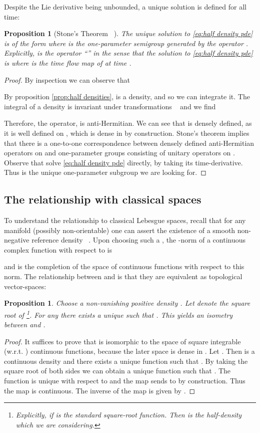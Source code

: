 \documentclass[final,leqno]{amsart}
\newtheorem{proposition}[theorem]{Proposition}
\begin{document}
Despite the Lie derivative being unbounded, a unique solution is defined for all time:
\begin{proposition}[Stone's Theorem ~\cite{Conway1990,Rudin1991}] \label{prop:stone}
	The unique solution to \eqref{eq:half density pde} is of the form  where  is the one-parameter semigroup generated by the operator .
	Explicitly,  is the operator ``'' in the sense that the solution to \eqref{eq:half density pde} is  where  is the time flow map of  at time .
\end{proposition}
\begin{proof}
	By inspection we can observe that
	
	By proposition \ref{prop:half densities},  is a density, and so we can integrate it.
	The integral of a density is invariant under  transformations ~\cite[Proposition 16.42]{Lee2006} and we find
	
	Therefore, the operator,  is anti-Hermitian.
	We can see that  is densely defined, as it is well defined on , which is dense in  by construction.
	Stone's theorem implies that there is a one-to-one correspondence between densely defined anti-Hermitian operators on 
	and one-parameter groups  consisting of unitary operators on .
	Observe that  solve \eqref{eq:half density pde} directly, by taking its time-derivative.
	Thus  is the unique one-parameter subgroup we are looking for.
\end{proof}

\subsection{The relationship with classical  spaces}
\label{sec:classical_Lebesgue}
To understand the relationship to classical Lebesgue spaces, recall that for any manifold  (possibly non-orientable) one can assert the existence of a smooth non-negative reference density ~\cite[Chapter 16]{Lee2006}.
Upon choosing such a , the -norm of a continuous complex function  with respect to  is

and  is the completion of the space of continuous functions with respect to this norm.
The relationship between  and  is that they are equivalent as topological vector-spaces:
\begin{proposition} \label{prop:non canonical}
	Choose a non-vanishing positive density .
	Let  denote the square root of \footnote{Explicitly, if  is the standard square-root function.
	Then  is the half-density which we are considering.}.
	For any  there exists a unique  such that .
	This yields an isometry between  and .
\end{proposition}
\begin{proof}
	It suffices to prove that  is isomorphic to the space of square integrable (w.r.t. ) continuous functions, because
	the later space is dense in .
	Let .  Then  is a continuous density and there exists a unique function  such that .
	By taking the square root of both sides we can obtain a unique function  such that .
	The function  is unique with respect to  and
	the map  sends  to  by construction.
	Thus the map is continuous.
	The inverse of the map is given by .
\end{proof}
\end{document}
